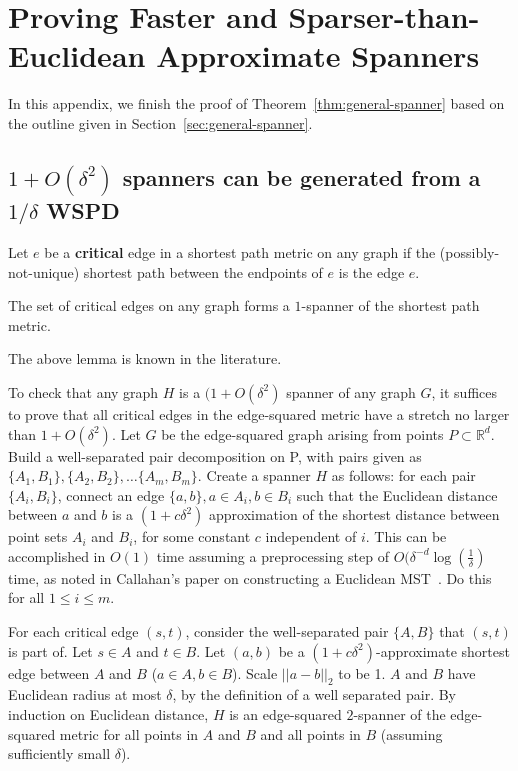 \section{Proving Faster and Sparser-than-Euclidean Approximate
  Spanners}\label{ap:general-spanner}
In this appendix, we finish the proof of
Theorem~\ref{thm:general-spanner} based on the outline given in
Section~\ref{sec:general-spanner}.

\subsection{$1+O(\delta^2)$ spanners can be generated from a
$1/\delta$ WSPD}

\begin{definition}\label{def:critical} Let $e$ be a \textbf{critical} edge in a
  shortest path metric on any graph if the
  (possibly-not-unique) shortest path between the endpoints of $e$ is the edge $e$. 
\end{definition}
\begin{lemma} The set of critical edges on any graph forms a $1$-spanner of the
shortest path metric. \end{lemma}
The above lemma is known in the literature.

To check that any graph $H$ is a $(1+O(\delta^2)$ spanner of any graph $G$, it suffices
to prove that all critical edges in the edge-squared metric have a stretch 
no larger than $1+O( \delta^2)$.  
Let $G$ be the edge-squared graph arising from points $P \subset \mathbb{R}^d$. Build a well-separated pair decomposition on P, with pairs given as $\{A_1, B_1\}, \{A_2, B_2\}, \ldots \{A_m, B_m\}$. 
Create a spanner $H$ as follows: for each pair $\{A_i, B_i\}$, connect
an edge $\{a, b\}, a\in A_i, b\in B_i$ such that the Euclidean distance
between $a$ and $b$ is a $(1+c\delta^2)$ approximation of the shortest distance
between point sets $A_i$ and $B_i$, for some constant $c$ independent of
$i$. This can be accomplished in $O(1)$ time assuming a preprocessing
step of $O(\delta^{-d} \log\left(\frac{1}{\delta}\right)$ time, as noted
in Callahan's paper on constructing a Euclidean MST~\cite{Callahan1995}. Do this for all $ 1 \leq i \leq m$.

For each critical edge $(s,t)$, consider the well-separated pair $\{A, B\}$ that $(s,t)$ is part of. Let $ s\in A$ and $t \in B$. Let $(a,b)$ be a $(1+c\delta^2)$-approximate shortest edge between $A$ and $B$ ($a \in A, b\in B$).
Scale $||a-b||_2$ to be 1. $A$ and $B$ have Euclidean radius at most
$\delta$, by the definition of a well separated pair. By induction on
Euclidean distance, $H$ is an edge-squared $2$-spanner of the
edge-squared metric for all points in $A$ and $B$ and all points in $B$
(assuming sufficiently small $\delta$).

